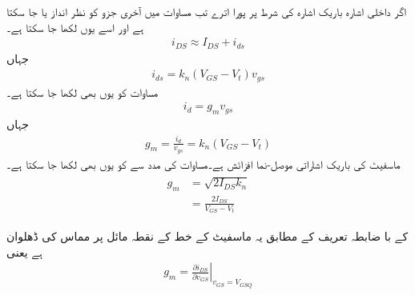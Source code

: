 اگر داخلی اشارہ باریک اشارہ کی شرط پر پورا  اترے تب مساوات  میں آخری جزو کو نظر انداز یا جا سکتا ہے اور اسے یوں لکھا جا سکتا ہے۔
\begin{align} \label{مساوات_میدانی_یکسمتی_اور_بدلتی_رو}
i_{DS} \approx I_{DS} +i_{ds}
\end{align}
جہاں
\begin{align} \label{مساوات_میدانی_باریک_رو_الف}
i_{ds}=k_n \left(V_{GS}-V_t \right )v_{gs}
\end{align}
مساوات   کو یوں بھی لکھا جا سکتا ہے۔
\begin{align} \label{مساوات_میدانی_خارجی_رو_بالمقابل_داخلی_دباو}
i_d=g_m v_{gs}
\end{align}
جہاں
\begin{align} \label{مساوات_میدانی_موصلیت_نما_بطور_افزائش}
g_m =\frac{i_d}{v_{gs}}=k_n \left(V_{GS}-V_t \right )
\end{align}
ماسفیٹ کی باریک اشاراتی موصل-نما افزائش ہے۔مساوات  کی مدد سے  کو یوں بھی لکھا جا سکتا ہے۔
\begin{gather}
\begin{aligned}\label{مساوات_ماسفیٹ_باریک_افزائش_کے_مختلف_مساوات}
g_m&=\sqrt{2 I_{DS} k_n}\\
&=\frac{2 I_{DS}}{V_{GS}-V_t}
\end{aligned}
\end{gather}

 کے با ضابطہ تعریف کے مطابق یہ ماسفیٹ کے   خط کے نقطہ مائل پر مماس کی ڈھلوان ہے یعنی
\begin{align}\label{مساوات_ماسفیٹ_افزائش_کا_جزوی_تفرق_سے_حصول}
g_m =\left. \frac{\partial i_{DS}}{\partial v_{GS}} \right |_{v_{GS}=V_{GSQ}}
\end{align}

